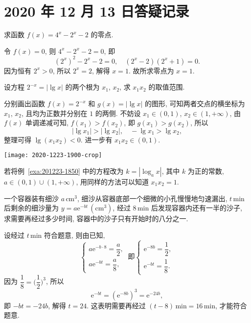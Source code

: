 \section{2020 年 12 月 13 日答疑记录}

\begin{example}
    求函数 $f(x)=4^x-2^x-2$ 的零点.
\end{example}
\begin{solution}
    令 $f(x)=0$, 则 $4^x-2^x-2=0$, 即
    \[(2^x)^2-2^x-2=0,\quad (2^x-2)(2^x+1)=0.\]
    因为恒有 $2^x>0$, 所以 $2^x=2$, 解得 $x=1$. 故所求零点为 $x=1$. 
\end{solution}

\begin{example}\label{exa:201223-1850}
    设方程 $2^{-x}= |\lg x|$ 的两个根为 $x_1$, $x_2$, 求 $x_1x_2$ 的取值范围.
\end{example}
\begin{solution}
    分别画出函数 $f(x)= 2^{-x}$ 和 $g(x)= |\lg x|$ 的图形, 可知两者交点的横坐标为 $x_1$, $x_2$, 且均为正数并分别在 $1$ 的两侧. 不妨设 $x_1\in(0,1)$, $x_2\in(1,+\infty)$, 由 $f(x)$ 单调递减可知, $f(x_1)>f(x_2)$, 即 $g(x_1)>g(x_2)$, 所以
    \[|\lg x_1|> |\lg x_2|,\quad -\lg x_1> \lg x_2,\]
    整理可得 $\lg (x_1x_2)<0$. 进一步有 $x_1x_2\in(0,1)$.
    
    \begin{center}
        \texttt{[image: 2020-1223-1900-crop]}
    \end{center}
\end{solution}
\begin{remark}
    若将例~\ref{exa:201223-1850} 中的方程改为 $k= |\log_a x|$, 其中 $k$ 为正的常数, $a\in(0,1)\cup (1,+\infty)$, 用同样的方法可以知道 $x_1x_2=1$.
\end{remark}

\begin{example}
    一个容器装有细沙 $a\,\text{cm}^3$, 细沙从容器底部一个细微的小孔慢慢地匀速漏出, $t\,\text{min}$ 后剩余的细沙量为 $y= a\mathrm{e}^{-bt}\,(\text{cm}^3)$, 经过 $8\,\text{min}$ 后发现容器内还有一半的沙子, 求需要再经过多少时间, 容器中的沙子只有开始时的八分之一.
\end{example}
\begin{solution}
    设经过 $t\,\text{min}$ 符合题意, 则由已知,
    \[\left\{\!\!\begin{array}{l}
        a\mathrm{e}^{-b\cdot 8}= \dfrac{a}2,\\[5pt]
        a\mathrm{e}^{-bt}= \dfrac{a}8,
        \end{array}\right.\ \text{即}
      \left\{\!\!\begin{array}{l}
        \mathrm{e}^{-8b}= \dfrac12,\\[3pt]
        \mathrm{e}^{-bt}= \dfrac18.
      \end{array}\right.\]
    因为 $\dfrac18= \biggl(\dfrac12\biggr)^3$, 所以
    \[\mathrm{e}^{-bt}= (\mathrm{e}^{-8b})^3= \mathrm{e}^{-24b},\]
    即 $-bt=-24b$, 解得 $t=24$. 这表明需要再经过 $(t-8)\,\text{min}= 16\,\text{min}$, 才能符合题意.
\end{solution}

